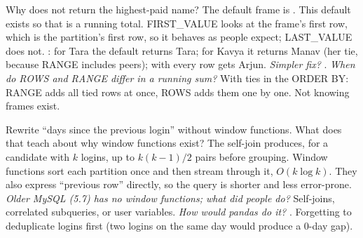 \begin{qa}{\deep Why does  not return the highest-paid name?}
\why The default frame is . This default exists so that  is a
running total. FIRST\_VALUE looks at the frame's first row, which is the partition's first row, so it behaves as people expect; LAST\_VALUE does not.
\worked {}: for Tara the default returns Tara; for Kavya it returns Manav (her tie, because RANGE includes peers); with
 every row gets Arjun.
\pushes \emph{Simpler fix?} . \emph{When do ROWS and RANGE differ in a running sum?} With ties in the
ORDER BY: RANGE adds all tied rows at once, ROWS adds them one by one.
\pitfall Not knowing frames exist.
\end{qa}

\begin{qa}{\deep Rewrite ``days since the previous login'' without window functions. What does that teach about why window functions exist?}
\why The self-join produces, for a candidate with $k$ logins, up to $k(k-1)/2$ pairs before grouping. Window functions sort each partition once and
then stream through it, $O(k \log k)$. They also express ``previous row'' directly, so the query is shorter and less error-prone.
\pushes \emph{Older MySQL (5.7) has no window functions; what did people do?} Self-joins, correlated subqueries, or user variables. \emph{How would pandas
do it?} .
\pitfall Forgetting to deduplicate logins first (two logins on the same day would produce a 0-day gap).
\end{qa}


